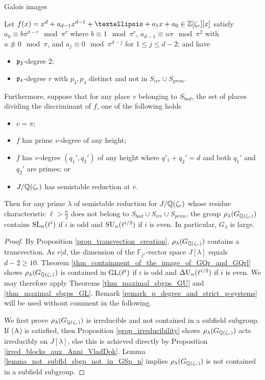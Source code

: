 \documentclass[11pt,a4paper]{article}
\newcommand{\Fli}{\mathbb{F}_{\ell^i}}
\newcommand{\Qr}{{\QQ(\zeta_r)}}
\newcommand{\Zr}{{\ZZ[\zeta_r]}}
\newcommand{\GQr}{G_{\QQ(\zeta_{r})}}
\newcommand{\Glam}{G_{\lambda}}
\begin{document}
\begin{section}{Galois images}
\begin{theorem}
Let $f(x) = x^d + a_{d-1}x^{d-1} + \ldots + a_1x+a_0 \in \Zr[x]$ satisfy  $a_0\equiv b\pi^{d-r} \mod{\pi^{r}}$ where $b \equiv 1 \mod{\pi^r}$, $a_{d-1} \equiv u\pi\mod{\pi^2}$ with $u \not \equiv 0 \mod{\pi}$, and $a_{j} \equiv 0\mod{\pi^{d-j}} $ for $1\leq j \leq d-2 $; and have
\begin{itemize}
    \item $\mathfrak{p}_3$-degree $2$;
    \item $\mathfrak{p}_4$-degree $r$
    with $p_3,p_4$ distinct and not in $ S_{irr} \cup S_{prim}$.
\end{itemize}
Furthermore, suppose that for any place $v$ belonging to $S_{bad}$, the set of places dividing the discriminant of $f$, one of the following holds
\begin{itemize}
    \item $v=\pi$;
    \item $f$ has prime $v$-degree of any height;
    \item $f$ has $v$-degree $(q_1',q_2')$ of any height where $q'_1+q_2' =d$ and both $q_1'$ and $q_2'$ are primes; or
    \item $J/\Qr$ has semistable reduction at $v$.
\end{itemize}

Then for any prime $\lambda$ of semistable reduction for $J/\Qr$ whose residue characteristic $\ell> \frac{n}{2}$ does not belong to $S_{bad} \cup S_{irr} \cup S_{prim}$, the group $\rho_\lambda(\GQr)$ contains $\SL_n(\ell^i)$ if $i$ is odd and $\SU_n(\ell^{i/2})$ if $i$ is even.
In particular, $\Glam$ is large. 
\end{theorem}


\begin{proof}

By Proposition \ref{prop_transvection_creation}, $\rho_\lambda(\GQr)$ contains a transvection.
As $r|d$, the dimension of the $\Fli$-vector space $J[\lambda]$ equals $d-2 \geq 10$.
Theorem \ref{thm_containment_of_the_image_of_GQr_and_GQrl} shows $\rho_\lambda(\GQr)$ is contained in $\GL(\ell^i)$ if $i$ is odd and $\DU_n(\ell^{i/2})$ if $i$ is even.
We may therefore apply Theorems \ref{thm_maximal_sbgps_GU} and \ref{thm_maximal_sbgps_GL}.
Remark \ref{remark_p_degree_and_strict_p-systems} will be used without comment in the following.

We first prove $\rho_\lambda(\GQr)$ is irreducible and not contained in a subfield subgroup.
If (A) is satisfied, then Proposition \ref{prop_irreducibility} shows $\rho_\lambda(\GQr)$ acts irreducibly on $J[\lambda]$, else this is achieved directly by Proposition \ref{irred_blocks_aux_Anni_VladDok}.
Lemma \ref{lemma_not_subfld_sbgp_not_in_GSp_n} implies $\rho_\lambda(\GQr)$ is not contained in a subfield subgroup.


\end{proof}
\end{section}
\end{document}
